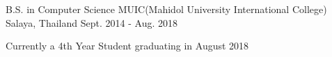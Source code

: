 

\begin{cventries}

  \cventry
    {B.S. in Computer Science} %
    {MUIC(Mahidol University International College)} %
    {Salaya, Thailand} %
    {Sept. 2014 - Aug. 2018} %
    {
      \begin{cvitems} %
        \item {Currently a 4th Year Student graduating in August 2018}
      \end{cvitems}
    }

\end{cventries}
